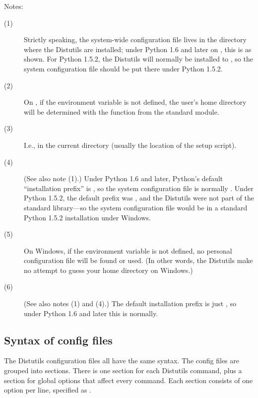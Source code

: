 \documentclass{howto}
\begin{document}
\noindent Notes:
\begin{description}
\item[(1)] Strictly speaking, the system-wide configuration file lives
  in the directory where the Distutils are installed; under Python 1.6
  and later on \UNIX, this is as shown. For Python 1.5.2, the Distutils
  will normally be installed to
  ,
  so the system configuration file should be put there under Python
  1.5.2.
\item[(2)] On \UNIX, if the  environment variable is not
  defined, the user's home directory will be determined with the
   function from the standard  module.
\item[(3)] I.e., in the current directory (usually the location of the
  setup script).
\item[(4)] (See also note (1).)  Under Python 1.6 and later, Python's
  default ``installation prefix'' is , so
  the system configuration file is normally
  .
  Under Python 1.5.2, the default prefix was
  , and the
  Distutils were not part of the standard library---so the system
  configuration file would be
  in a standard Python 1.5.2 installation under Windows.
\item[(5)] On Windows, if the  environment variable is not
  defined, no personal configuration file will be found or used.  (In
  other words, the Distutils make no attempt to guess your home
  directory on Windows.)
\item[(6)] (See also notes (1) and (4).)  The default installation
  prefix is just , so under Python 1.6 and later this is
  normally.  
\end{description}


\subsection{Syntax of config files}
\label{config-syntax}

The Distutils configuration files all have the same syntax.  The config
files are grouped into sections.  There is one section for each Distutils
command, plus a  section for global options that affect
every command.  Each section consists of one option per line, specified
as .
\end{document}
